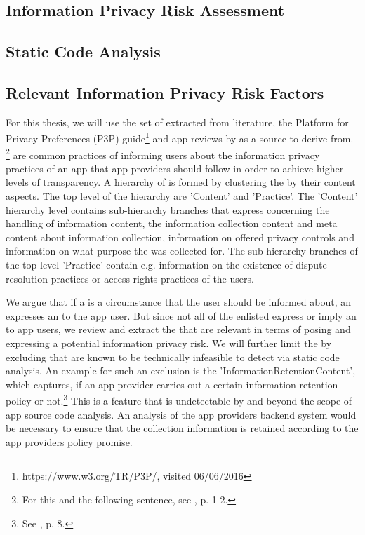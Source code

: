\subsection{Information Privacy Risk Assessment}

\subsection{Static Code Analysis}

\subsection{Relevant Information Privacy Risk Factors}


For this thesis, we will use the set of \ipp extracted from literature, the Platform for Privacy Preferences (\acs{P3P}) guide\footnote{https://www.w3.org/TR/P3P/, visited 06/06/2016} and app reviews by \cite{Dehling2016} as a source to derive \iprfs from. \footnote{For this and the following sentence, see \cite{Dehling2016}, p. 1-2.} 
\Ipp are common practices of informing users about the information privacy practices of an app that app providers should follow in order to achieve higher levels of transparency.
A hierarchy of \ipp is formed by clustering the \ipp by their content aspects. 
The top level of the hierarchy are 'Content' and 'Practice'.
The 'Content' hierarchy level contains sub-hierarchy branches that express \ipp concerning the handling of information content, the information collection content and meta content about information collection, information on offered privacy controls and information on what purpose the \ipp was collected for.
The sub-hierarchy branches of the top-level 'Practice' contain e.g. information on the existence of dispute resolution practices or access rights practices of the users.

We argue that if a \ipp is a circumstance that the user should be informed about, an \ipp expresses an \ipr to the app user.
But since not all of the enlisted \ipp express or imply an \ipr to app users, we review and extract the \ipp that are relevant in terms of posing and expressing a potential information privacy risk.
We will further limit the \ipp by excluding \ipp that are known to be technically infeasible to detect via static code analysis.
An example for such an exclusion is the \ipp 'InformationRetentionContent', which captures, if an app provider carries out a certain information retention policy or not.\footnote{See \cite{Dehling2016}, p. 8.}
This is a feature that is undetectable by \sca and beyond the scope of app source code analysis.
An analysis of the app providers backend system would be necessary to ensure that the collection information is retained according to the app providers policy promise.

